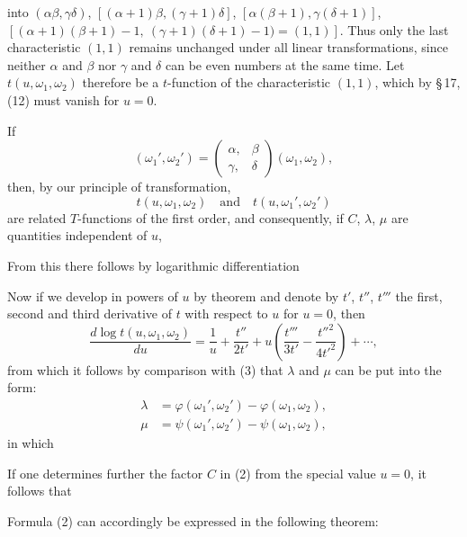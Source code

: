 into $(\alpha\beta, \gamma\delta)$, $[(\alpha+1)\beta, (\gamma+1)\delta]$, $[\alpha(\beta+1), \gamma(\delta+1)]$, $[(\alpha+1)(\beta+1)-1,\ (\gamma+1)(\delta+1)-1)=(1,1)]$.
Thus only the last characteristic $(1,1)$ remains unchanged under all linear transformations, since neither $\alpha$ and $\beta$ nor $\gamma$ and $\delta$ can be even numbers at the same time. Let $t(u, \omega_1, \omega_2)$ therefore be a $t$-function of the characteristic $(1,1)$, which by \S\,17, (12) must vanish for $u = 0$.

If
\[
(\omega_1', \omega_2') = \begin{pmatrix} \alpha, & \beta \\ \gamma, & \delta \end{pmatrix} (\omega_1, \omega_2),
\]
then, by our principle of transformation,
\[
t(u, \omega_1, \omega_2) \quad \text{and} \quad t(u, \omega_1', \omega_2')
\]
are related $T$-functions of the first order, and consequently, if $C$, $\lambda$, $\mu$ are quantities independent of $u$,

From this there follows by logarithmic differentiation

Now if we develop in powers of $u$ by  theorem and denote by $t'$, $t''$, $t'''$ the first, second and third derivative of $t$ with respect to $u$ for $u = 0$, then
\[
\frac{d\log t(u,\omega_1,\omega_2)}{du} = \frac{1}{u} + \frac{t''}{2t'} + u\left(\frac{t'''}{3t'} - \frac{t''^2}{4t'^2}\right) + \cdots,
\]
from which it follows by comparison with (3) that $\lambda$ and $\mu$ can be put into the form:
\[
\begin{aligned}
\lambda &= \varphi(\omega_1',\omega_2') - \varphi(\omega_1,\omega_2),\\
\mu &= \psi(\omega_1',\omega_2') - \psi(\omega_1,\omega_2),
\end{aligned}
\]
in which

If one determines further the factor $C$ in (2) from the special value $u = 0$, it follows that

Formula (2) can accordingly be expressed in the following theorem:


